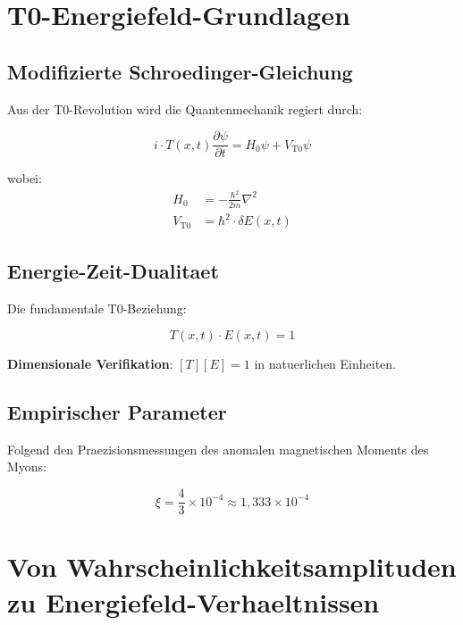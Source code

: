 \documentclass[12pt,a4paper]{article}
\newcommand{\xipar}{\xi}
\begin{document}
	\section{T0-Energiefeld-Grundlagen}
	
	\subsection{Modifizierte Schroedinger-Gleichung}
	
	Aus der T0-Revolution wird die Quantenmechanik regiert durch:
	
	\begin{equation}
		\boxed{i \cdot T(x,t) \frac{\partial\psi}{\partial t} = H_0 \psi + V_{\mathrm{T0}} \psi}
		\label{eq:modifizierte_schroedinger}
	\end{equation}
	
	wobei:
	\begin{align}
		H_0 &= -\frac{\hbar^2}{2m} \nabla^2 \\
		V_{\mathrm{T0}} &= \hbar^2 \cdot \delta E(x,t)
	\end{align}
	
	\subsection{Energie-Zeit-Dualitaet}
	
	Die fundamentale T0-Beziehung:
	
	\begin{equation}
		\boxed{T(x,t) \cdot E(x,t) = 1}
		\label{eq:energie_zeit_dualitaet}
	\end{equation}
	
	\textbf{Dimensionale Verifikation}: $[T][E] = 1$ in natuerlichen Einheiten.
	
	\subsection{Empirischer Parameter}
	
	Folgend den Praezisionsmessungen des anomalen magnetischen Moments des Myons:
	
	\begin{equation}
		\boxed{\xipar = \frac{4}{3} \times 10^{-4} \approx 1{,}333 \times 10^{-4}}
		\label{eq:empirischer_parameter}
	\end{equation}
	
	\section{Von Wahrscheinlichkeitsamplituden zu Energiefeld-Verhaeltnissen}
	
\end{document}
